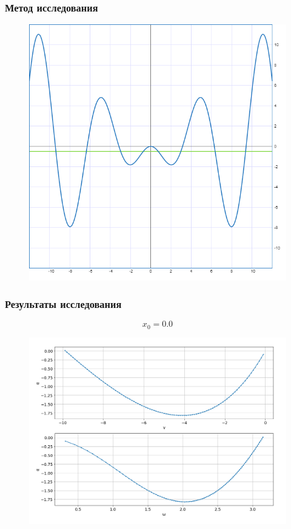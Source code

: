 \documentclass[fullscreen=true, unicode, bookmarks=false]{beamer}
\begin{document}
\begin{frame}
\frametitle{ Метод исследования } 

\begin{figure}
\includegraphics[scale=0.37]{xsinx.png} 
\end{figure}

\end{frame}

\begin{frame}
\frametitle{ Результаты исследования } 

{\tiny  $$ x_0 = 0.0 $$}
\vspace{-0.8cm}
\begin{figure}
\includegraphics[scale=0.35]{0,0.png} 
\end{figure}

\end{frame}
\end{document}
